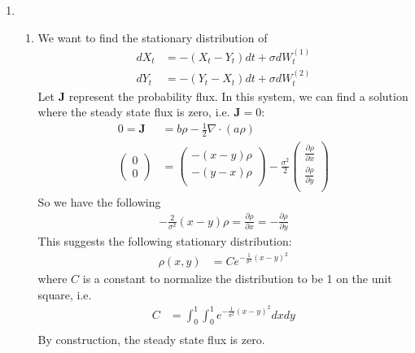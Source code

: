 \documentclass[12pt]{article}
\theoremstyle{plain}
\theoremstyle{definition}
\theoremstyle{remark}
\begin{document}
\begin{enumerate}
  \item %
    \begin{enumerate}
      \item %
        We want to find the stationary distribution of
        \begin{align*}
          dX_t &= -(X_t - Y_t)dt + \sigma dW_t^{(1)} \\
          dY_t &= -(Y_t - X_t)dt + \sigma dW_t^{(2)}
        \end{align*}
        Let $\mathbf{J}$ represent the probability flux. In this system,
        we can find a solution where the steady state flux is zero, i.e.
        $\mathbf{J}=0$:
        \begin{align*}
          0 = \mathbf{J} &= b\rho - \frac{1}{2}\nabla\cdot(a\rho)\\
          \begin{pmatrix}
            0 \\ 0
          \end{pmatrix}
          &=
          \begin{pmatrix}
            -(x-y) \rho \\
            -(y-x) \rho \\
          \end{pmatrix}
          - \frac{\sigma^2}{2}
          \begin{pmatrix}
            \frac{\partial \rho}{\partial x} \\
            \frac{\partial \rho}{\partial y} \\
          \end{pmatrix}
        \end{align*}
        So we have the following
        \begin{align*}
          -\frac{2}{\sigma^2} (x-y) \rho
          = \frac{\partial \rho}{\partial x}
          = -\frac{\partial \rho}{\partial y}
        \end{align*}
        This suggests the following stationary distribution:
        \begin{align*}
          \rho(x,y)
          &=
          C e^{-\frac{1}{\sigma^2}(x-y)^2}
        \end{align*}
        where $C$ is a constant to normalize the distribution to be 1 on
        the unit square, i.e.
        \begin{align*}
          C &= \int^1_0\int^1_0 e^{-\frac{1}{\sigma^2}(x-y)^2} dx dy\\
        \end{align*}
        By construction, the steady state flux is zero.


\end{enumerate}
\end{enumerate}
\end{document}
